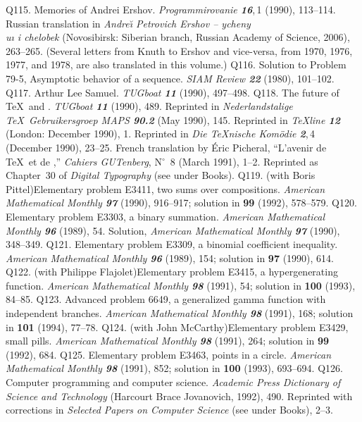 \p Q115. Memories of Andrei Ershov. {\sl Programmirovanie\/ \bf 16},\,1
 (1990), 113--114.
 Russian translation in {\sl Andre{\u\i} Petrovich Ershov -- ycheny{\\u\i}
 i chelobek\/} (Novosibirsk: Siberian branch, Russian Academy of Science,
 2006), 263--265. (Several letters from Knuth to Ershov and vice-versa, from
 1970, 1976, 1977, and 1978, are also translated in this volume.)
\p Q116. Solution to Problem 79-5, Asymptotic behavior of a sequence.
 {\sl SIAM Review\/ \bf22} (1980), 101--102.
\p Q117. Arthur Lee Samuel. {\sl TUGboat \bf11} (1990), 497--498.
\p Q118. The future of \TeX\ and \MF. {\sl TUGboat \bf11} (1990), 489.
 Reprinted in {\sl Nederlandstalige \TeX\ Gebruikersgroep MAPS\/ \bf90.2}
 (May 1990), 145.
 Reprinted in {\sl \TeX line\/ \bf12} (London: December 1990), 1.
 Reprinted in {\sl Die \TeX nische Kom\"odie\/ \bf2},\,4 (December 1990),
 23--25.
 French translation by \'Eric Picheral, ``L'avenir de \TeX\ et de \MF,'' {\sl
 Cahiers GUTenberg}, N$^\circ$~8 (March 1991), 1--2.
 Reprinted as Chapter~30 of {\sl Digital Typography\/} (see under Books).
\p Q119. (with Boris Pittel)\xskip Elementary problem E3411,
 two sums over compositions.
 {\sl American Mathematical Monthly\/ \bf 97} (1990), 916--917;
 solution in {\bf 99} (1992), 578--579.
\p Q120. Elementary problem E3303, a binary summation.
 {\sl American Mathematical Monthly\/ \bf 96} (1989), 54.
 Solution, {\sl American Mathematical Monthly\/ \bf 97} (1990), 348--349.
\p Q121. Elementary problem E3309, a binomial coefficient inequality.
 {\sl American Mathematical Monthly\/ \bf 96} (1989), 154;
 solution in {\bf 97} (1990), 614.
\p Q122. (with Philippe Flajolet)\xskip Elementary problem E3415,
 a hypergenerating function. {\sl American Mathematical Monthly\/ \bf 98}
 (1991), 54; solution in {\bf 100} (1993), 84--85.
\p Q123. Advanced problem 6649, a generalized gamma function with
 independent branches.
 {\sl American Mathematical Monthly\/ \bf 98} (1991), 168;
 solution in {\bf 101} (1994), 77--78.
\p Q124. (with John McCarthy)\xskip Elementary problem E3429, small pills.
 {\sl American Mathematical Monthly\/ \bf 98} (1991), 264;
 solution in {\bf 99} (1992), 684.
\p Q125. Elementary problem E3463, points in a circle.
 {\sl American Mathematical Monthly\/ \bf 98} (1991), 852;
 solution in {\bf100} (1993), 693--694.
\p Q126. Computer programming and computer science. {\sl Academic Press
 Dictionary of Science and Technology\/} (Harcourt Brace Jovanovich, 1992),
 490. Reprinted with corrections in {\sl Selected Papers on Computer Science\/}
 (see under Books), 2--3.
